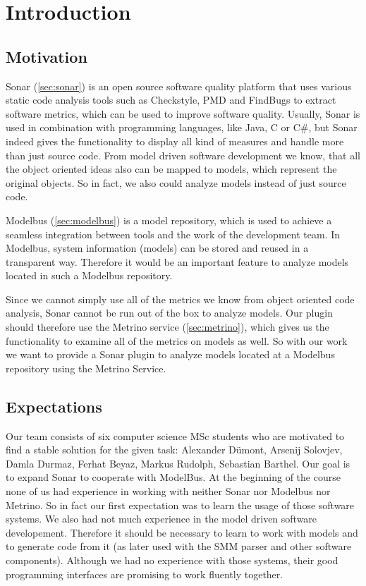 \chapter{Introduction}

\section{Motivation}
Sonar (\autoref{sec:sonar}) is an open source software quality platform that uses various static code analysis tools such as Checkstyle, PMD and FindBugs to extract software metrics, which can be used to improve software quality. Usually, Sonar is used in combination with programming languages, like Java, C or C\#, but Sonar indeed gives the functionality to display all kind of measures and handle more than just source code. From model driven software development we know, that all the object oriented ideas also can be mapped to models, which represent the original objects. So in fact, we also could analyze models instead of just source code.

Modelbus (\autoref{sec:modelbus}) is a model repository, which is used to achieve a seamless integration between tools and the work of the development team. In Modelbus, system information (models) can be stored and reused in a transparent way. Therefore it would be an important feature to analyze models located in such a Modelbus repository.

Since we cannot simply use all of the metrics we know from object oriented code analysis, Sonar cannot be run out of the box to analyze models. Our plugin should therefore use the Metrino service (\autoref{sec:metrino}), which gives us the functionality to examine all of the metrics on models as well. So with our work we want to provide a Sonar plugin to analyze models located at a Modelbus repository using the Metrino Service.

\section{Expectations}
Our team consists of six computer science MSc students who are motivated to find a stable solution for the given task: Alexander Dümont, Arsenij Solovjev, Damla Durmaz, Ferhat Beyaz, Markus Rudolph, Sebastian Barthel.
Our goal is to expand Sonar to cooperate with ModelBus. At the beginning of the course none of us had experience in working with neither Sonar nor Modelbus nor Metrino. So in fact our first expectation was to learn the usage of those software systems. We also had not much experience in the model driven software developement. Therefore it should be necessary to learn to work with models and to generate code from it (as later used with the SMM parser and other software components). Although we had no experience with those systems, their good programming interfaces are promising to work fluently together.

